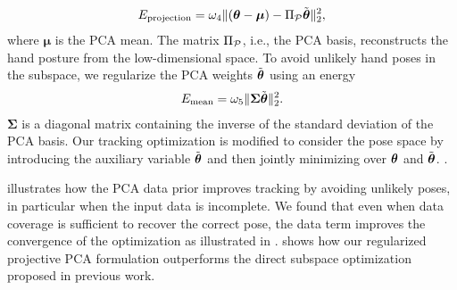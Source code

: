 % 
\begin{eqnarray}
E_{\text{projection}}  = \omega_4 \|(\boldsymbol{\theta} - \boldsymbol{\mu}) - \Pi_{\mathcal{P}} \tilde{\boldsymbol{\theta}} \|_2^2,   
\label{eq:pcaproj}
\end{eqnarray}
% 
where $\boldsymbol{\mu}$ is the PCA mean. The matrix $\Pi_{\mathcal{P}}$, i.e., the PCA basis,
reconstructs the hand posture from the low-dimensional space. 
To avoid unlikely hand poses in the subspace, we regularize the PCA weights $\tilde{\boldsymbol{\theta}}$ using an energy
% 
\begin{eqnarray}
E_{\text{mean}} = \omega_5 \|\boldsymbol{\Sigma} \tilde{\boldsymbol{\theta}} \|_2^2. 
\label{eq:pcareg}
\end{eqnarray}
% 
$\boldsymbol{\Sigma}$ is a diagonal matrix containing the inverse of the standard deviation of the PCA basis.
Our tracking optimization is modified to consider the pose space by introducing the auxiliary variable $\tilde{\boldsymbol{\theta}}$ and then jointly minimizing over $\boldsymbol{\theta}$ and $\tilde{\boldsymbol{\theta}}$. .
% 

 illustrates how the PCA data prior improves tracking by avoiding unlikely poses, in particular when the input data is incomplete.
We found that even when data  coverage is sufficient to recover the correct pose, the data term improves the convergence of the optimization as illustrated in .
% 
 shows how our regularized projective PCA formulation outperforms the direct subspace optimization proposed in previous work.





